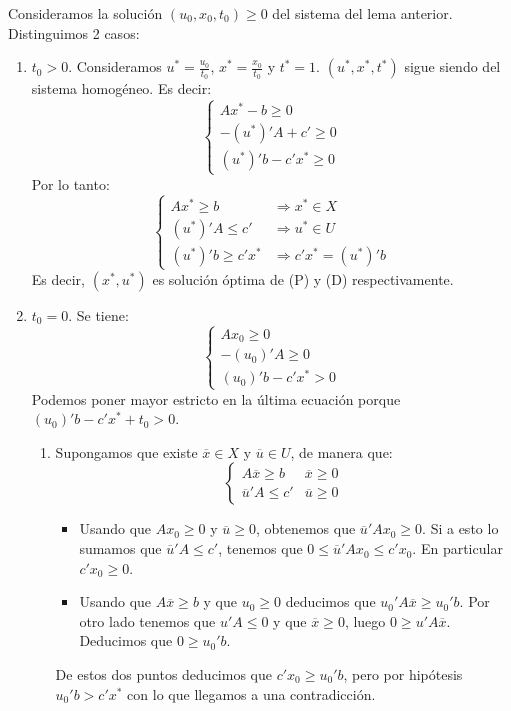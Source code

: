 \documentclass[PM.tex]{subfiles}
\begin{document}
\begin{dem} Consideramos la solución $(u_0,x_0,t_0)\geq 0$ del sistema del lema anterior. Distinguimos 2 casos:
\begin{enumerate}
	\item $t_0 > 0$. Consideramos $u^* = \frac{u_0}{t_0}$, $x^* = \frac{x_0}{t_0}$ y $t^* = 1$. $(u^*,x^*,t^*)$ sigue siendo 	 del sistema homogéneo. Es decir:
\[\begin{cases}
	Ax^* - b ≥ 0\\
	-(u^*)'A + c' ≥ 0\\
	(u^*)'b - c'x^* ≥ 0
\end{cases}\]
Por lo tanto:
\[\begin{cases}
	Ax^* ≥ b & \Rightarrow x^* \in X\\
	(u^*)'A ≤ c' & \Rightarrow u^* \in U\\
	(u^*)'b ≥ c'x^* & \Rightarrow c'x^* = (u^*)'b
\end{cases}\]
Es decir, $(x^*,u^*)$ es solución óptima de (P) y (D) respectivamente.
	\item $t_0=0$. Se tiene:
\[\begin{cases}
	Ax_0 ≥ 0\\
	-(u_0)'A  ≥ 0\\
	(u_0)'b - c'x^* > 0
\end{cases}\]
	Podemos poner mayor estricto en la última ecuación porque $(u_0)'b-c'x^*+t_0 > 0$.
	\begin{enumerate}
	\item Supongamos que existe $\overline{x} \in X$ y $\overline{u} \in U$, de manera que:
	\[\begin{cases}
		A\overline{x} ≥ b & \overline{x} ≥ 0\\
		\overline{u}'A ≤ c' & \overline{u} ≥ 0
	\end{cases}\]
	\begin{itemize}
	\item Usando que $Ax_0 ≥ 0$ y $\overline{u} ≥ 0$, obtenemos que $\overline{u}'Ax_0≥0$. Si a esto lo sumamos que $\overline{u}'A ≤ c'$, tenemos que $0\leq\overline{u}'Ax_0≤c'x_0 $. En particular $c'x_0 ≥ 0$.
	\item  Usando que $A\overline{x} ≥ b$ y que $u_0 ≥ 0$ deducimos que $u_0'A\overline{x}≥u_0'b $. Por otro lado tenemos que $u'A ≤ 0$ y que $\overline{x} ≥ 0$, luego $0\geq u'A\overline{x}$. Deducimos que $0 \geq u_0'b$.
\end{itemize}
 De estos dos puntos deducimos que $c'x_0  \geq u_0'b$, pero por hipótesis $u_0'b >  c'x^*$ con lo que llegamos a una contradicción.

\end{enumerate}
\end{enumerate}
\end{dem}
\end{document}
